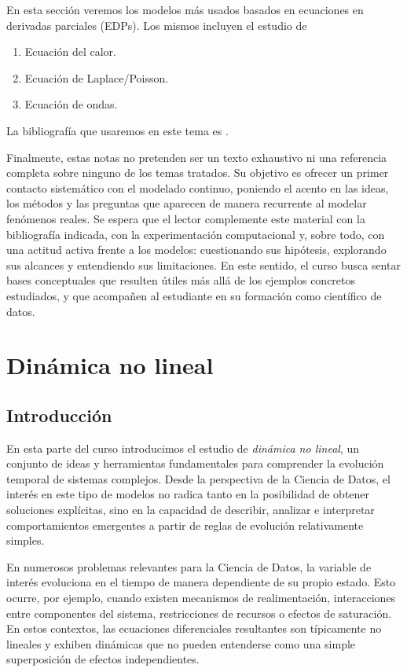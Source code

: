 \documentclass[12pt, a4paper]{amsbook}
\theoremstyle{remark}
\theoremstyle{definition}
\numberwithin{section}{chapter}
\numberwithin{subsection}{section}
\numberwithin{equation}{section}
\numberwithin{figure}{chapter}
\begin{document}
En esta sección veremos los modelos más usados basados en ecuaciones en derivadas parciales (EDPs). Los mismos incluyen el estudio de
\begin{enumerate}
\item Ecuación del calor.

\item Ecuación de Laplace/Poisson.

\item Ecuación de ondas.
\end{enumerate}

La bibliografía que usaremos en este tema es \cite{Evans, Bonder, Salsa, Strauss}.

Finalmente, estas notas no pretenden ser un texto exhaustivo ni una referencia completa sobre ninguno de los temas tratados. Su objetivo es ofrecer un primer contacto sistemático con el modelado continuo, poniendo el acento en las ideas, los métodos y las preguntas que aparecen de manera recurrente al modelar fenómenos reales. Se espera que el lector complemente este material con la bibliografía indicada, con la experimentación computacional y, sobre todo, con una actitud activa frente a los modelos: cuestionando sus hipótesis, explorando sus alcances y entendiendo sus limitaciones. En este sentido, el curso busca sentar bases conceptuales que resulten útiles más allá de los ejemplos concretos estudiados, y que acompañen al estudiante en su formación como científico de datos.


\mainmatter

\part{Dinámica no lineal}
\chapter{Introducción}\label{cap:intro-I}

En esta parte del curso introducimos el estudio de \emph{dinámica no lineal}, un conjunto de ideas y herramientas fundamentales para comprender la evolución temporal de sistemas complejos. Desde la perspectiva de la Ciencia de Datos, el interés en este tipo de modelos no radica tanto en la posibilidad de obtener soluciones explícitas, sino en la capacidad de describir, analizar e interpretar comportamientos emergentes a partir de reglas de evolución relativamente simples.

En numerosos problemas relevantes para la Ciencia de Datos, la variable de interés evoluciona en el tiempo de manera dependiente de su propio estado. Esto ocurre, por ejemplo, cuando existen mecanismos de realimentación, interacciones entre componentes del sistema, restricciones de recursos o efectos de saturación. En estos contextos, las ecuaciones diferenciales resultantes son típicamente no lineales y exhiben dinámicas que no pueden entenderse como una simple superposición de efectos independientes.
\end{document}
